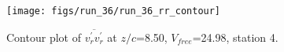 \begin{figure}[H]
\centering
\texttt{[image: figs/run\_36/run\_36\_rr\_contour]}
\caption{Contour plot of $\overline{v_{r}^{\prime} v_{r}^{\prime}}$ at $z/c$=8.50, $V_{free}$=24.98, station 4.}
\label{fig:run_36_rr_contour}
\end{figure}


